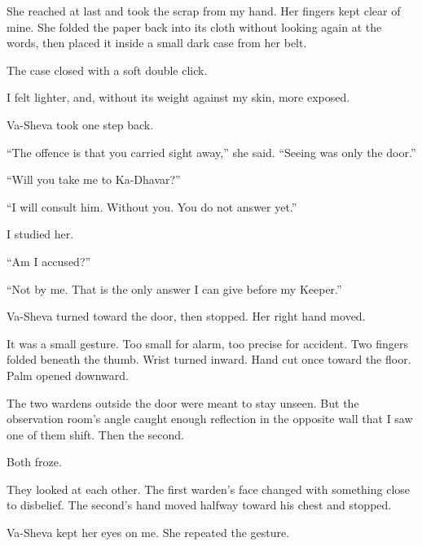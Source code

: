 She reached at last and took the scrap from my hand. Her fingers kept clear of mine. She folded the paper back into its cloth without looking again at the words, then placed it inside a small dark case from her belt.\par

The case closed with a soft double click.\par

I felt lighter, and, without its weight against my skin, more exposed.\par

Va-Sheva took one step back.\par

``The offence is that you carried sight away,'' she said. ``Seeing was only the door.''\par

``Will you take me to Ka-Dhavar?''\par

``I will consult him. Without you. You do not answer yet.''\par

I studied her.\par

``Am I accused?''\par

``Not by me. That is the only answer I can give before my Keeper.''\par

Va-Sheva turned toward the door, then stopped. Her right hand moved.\par

It was a small gesture. Too small for alarm, too precise for accident. Two fingers folded beneath the thumb. Wrist turned inward. Hand cut once toward the floor. Palm opened downward.\par

The two wardens outside the door were meant to stay unseen. But the observation room's angle caught enough reflection in the opposite wall that I saw one of them shift. Then the second.\par

Both froze.\par

They looked at each other. The first warden's face changed with something close to disbelief. The second's hand moved halfway toward his chest and stopped.\par

Va-Sheva kept her eyes on me. She repeated the gesture.\par

